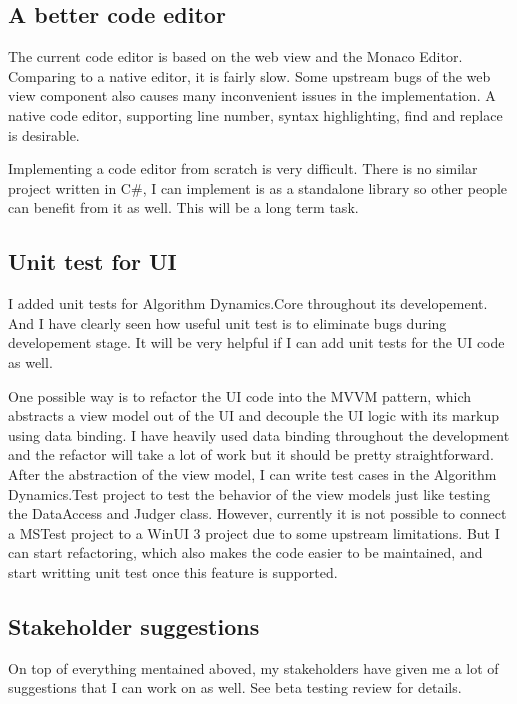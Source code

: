 \documentclass[a4paper]{report}
\begin{document}
\subsection{A better code editor}

The current code editor is based on the web view and the Monaco Editor. Comparing to a native editor, it is fairly slow. Some upstream bugs of the web view component also causes many inconvenient issues in the implementation. A native code editor, supporting line number, syntax highlighting, find and replace is desirable.

Implementing a code editor from scratch is very difficult. There is no similar project written in C\#, I can implement is as a standalone library so other people can benefit from it as well. This will be a long term task.

\subsection{Unit test for UI}

I added unit tests for Algorithm Dynamics.Core throughout its developement. And I have clearly seen how useful unit test is to eliminate bugs during developement stage. It will be very helpful if I can add unit tests for the UI code as well.

One possible way is to refactor the UI code into the MVVM\cite{microsoft:docs:mvvm-introduction} pattern, which abstracts a view model out of the UI and decouple the UI logic with its markup using data binding\cite{microsoft:docs:data-binding-and-mvvm}. I have heavily used data binding throughout the development and the refactor will take a lot of work but it should be pretty straightforward. After the abstraction of the view model, I can write test cases in the Algorithm Dynamics.Test project to test the behavior of the view models just like testing the DataAccess and Judger class. However, currently it is not possible to connect a MSTest project to a WinUI 3 project due to some upstream limitations\cite{github:microsoft-ui-xaml:6258}. But I can start refactoring, which also makes the code easier to be maintained, and start writting unit test once this feature is supported.

\subsection{Stakeholder suggestions}

On top of everything mentained aboved, my stakeholders have given me a lot of suggestions that I can work on as well. See beta testing review for details.
\end{document}
